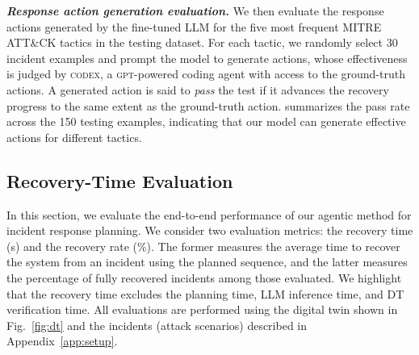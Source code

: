 \documentclass[runningheads,10pt]{llncs}
\begin{document}
\noindent\textit{\textbf{Response action generation evaluation.}}
We then evaluate the response actions generated by the fine-tuned LLM for the five most frequent MITRE ATT\&CK tactics in the testing dataset. For each tactic, we randomly select 30 incident examples and prompt the model to generate actions, whose effectiveness is judged by \textsc{codex}, a \textsc{gpt}-powered coding agent with access to the ground-truth actions. A generated action is said to \textit{pass} the test if it advances the recovery progress to the same extent as the ground-truth action.  summarizes the pass rate across the 150 testing examples, indicating that our model can generate effective actions for different tactics.
\begin{table}[h]
    \centering
    \caption{Evaluation of the LLM for action generation.}
    \label{tab:action-recovery-effect}
    \vspace{-4em}
\end{table}

\subsection{Recovery-Time Evaluation}
In this section, we evaluate the end-to-end performance of our agentic method for incident response planning. We consider two evaluation metrics: the recovery time (s) and the recovery rate (\%). The former measures the average time to recover the system from an incident using the planned sequence, and the latter measures the percentage of fully recovered incidents among those evaluated. We highlight that the recovery time excludes the planning time, LLM inference time, and DT verification time. All evaluations are performed using the digital twin shown in Fig.~\ref{fig:dt} and the incidents (attack scenarios) described in Appendix~\ref{app:setup}.
\end{document}
